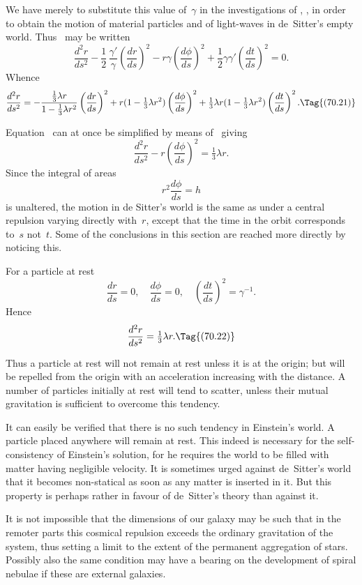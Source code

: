 \documentclass[12pt]{book}
\begin{document}
We have merely to substitute this value of~$\gamma$ in the investigations of
, , in order to obtain the motion of material particles and of light-waves
in de~Sitter's empty world. Thus ~may be written
\[
\frac{d^{2}r}{ds^{2}}
  - \frac{1}{2}\, \frac{\gamma'}{\gamma} \left(\frac{dr}{ds}\right)^{2}
  - r\gamma \left(\frac{d\phi}{ds}\right)^{2}
  + \frac{1}{2}\gamma\gamma' \left(\frac{dt}{ds}\right)^{2} = 0.
\]
Whence
\[
\frac{d^{2}r}{ds^{2}}
  = -\frac{\frac{1}{3}\lambda r}{1 - \frac{1}{3}\lambda r^{2}} \left(\frac{dr}{ds}\right)^{2}
  + r(1 - \tfrac{1}{3}\lambda r^{2}) \left(\frac{d\phi}{ds}\right)^{2}
  + \tfrac{1}{3}\lambda r(1 - \tfrac{1}{3}\lambda r^{2}) \left(\frac{dt}{ds}\right)^{2}.
  \Tag{(70.21)}
\]

Equation~ can at once be simplified by means of~ giving
\[
\frac{d^2 r}{ds^2} - r\left(\frac{d\phi}{ds}\right)^2 = \tfrac{1}{3}\lambda r.
\]
Since the integral of areas
\[
r^2\frac{d\phi}{ds} = h
\]
is unaltered, the motion in de Sitter's world is the same as under a central repulsion varying directly with~$r$,
except that the time in the orbit corresponds to~$s$ not~$t$.
Some of the conclusions in this section are reached more directly by noticing this.

For a particle at rest
\[
\frac{dr}{ds} = 0,\quad
\frac{d\phi}{ds} = 0,\quad
\left(\frac{dt}{ds}\right)^{2} = \gamma^{-1}.
\]
Hence
\[
\frac{d^{2}r}{ds^{2}} = \tfrac{1}{3}\lambda r.
\Tag{(70.22)}
\]

Thus a particle at rest will not remain at rest unless it is at the origin;
but will be repelled from the origin with an acceleration increasing with the
distance. A number of particles initially at rest will tend to scatter, unless
their mutual gravitation is sufficient to overcome this tendency.

It can easily be verified that there is no such tendency in Einstein's world.
A particle placed anywhere will remain at rest. This indeed is necessary for
the self\hyp{}consistency of Einstein's solution, for he requires the world to be
filled with matter having negligible velocity. It is sometimes urged against
de~Sitter's world that it becomes non\hyp{}statical as soon as any matter is inserted
in it. But this property is perhaps rather in favour of de~Sitter's theory than
against it.

It is not impossible that the dimensions of our galaxy may be such that in the remoter parts this cosmical
repulsion exceeds the ordinary gravitation of the system, thus setting a limit to the extent of the permanent
aggregation of stars.
Possibly also the same condition may have a bearing on the development of spiral nebulae if these are external
galaxies.
\end{document}
